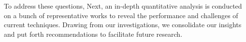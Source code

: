 To address these questions, 
Next, an in-depth quantitative analysis is conducted on a bunch of representative works to reveal the performance and challenges of current techniques.
Drawing from our investigations, we consolidate our insights and put forth recommendations to facilitate future research.



